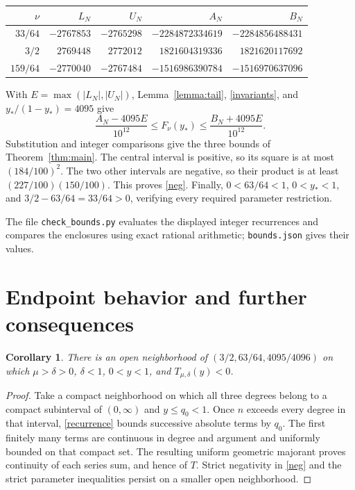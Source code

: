 \documentclass[11pt]{article}
\newtheorem{corollary}[theorem]{Corollary}
\newcommand{\F}{F}
\begin{document}
\begin{center}
\small
\begin{tabular}{@{}rrrrr@{}}
\toprule
$\nu$ & $L_N$ & $U_N$ & $A_N$ & $B_N$\\
\midrule
$33/64$ & $-2767853$ & $-2765298$ & $-2284872334619$ & $-2284856488431$\\
$3/2$ & $2769448$ & $2772012$ & $1821604319336$ & $1821620117692$\\
$159/64$ & $-2770040$ & $-2767484$ & $-1516986390784$ & $-1516970637096$\\
\bottomrule
\end{tabular}
\end{center}
With $E=\max(|L_N|,|U_N|)$, Lemma~\ref{lemma:tail},
\eqref{invariants}, and $y_* /(1-y_*)=4095$ give
\begin{equation}\label{enclosure}
 \frac{A_N-4095E}{10^{12}}\leq\F_\nu(y_*)\leq
 \frac{B_N+4095E}{10^{12}}.
\end{equation}
Substitution and integer comparisons give the three bounds of
Theorem~\ref{thm:main}. The central interval is positive, so its square is
at most $(184/100)^2$. The two other intervals are negative, so their
product is at least $(227/100)(150/100)$. This proves \eqref{neg}.
Finally, $0<63/64<1$, $0<y_*<1$, and
$3/2-63/64=33/64>0$, verifying every required parameter restriction.

The file \texttt{check\_bounds.py} evaluates the displayed integer
recurrences and compares the enclosures using exact rational arithmetic;
\texttt{bounds.json} gives their values.

\section{Endpoint behavior and further consequences}
\begin{corollary}\label{cor:open}
There is an open neighborhood of $(3/2,63/64,4095/4096)$ on which
$\mu>\delta>0$, $\delta<1$, $0<y<1$, and $T_{\mu,\delta}(y)<0$.
\end{corollary}
\begin{proof}
Take a compact neighborhood on which all three degrees belong to a
compact subinterval of $(0,\infty)$ and $y\leq q_0<1$.
Once $n$ exceeds every degree in that interval,
\eqref{recurrence} bounds successive absolute terms by $q_0$.
The first finitely many terms are continuous in degree and argument
and uniformly bounded on that compact set. The resulting uniform
geometric majorant proves continuity of each series sum, and hence
of $T$. Strict negativity in \eqref{neg} and the strict parameter
inequalities persist on a smaller open neighborhood.
\end{proof}
\end{document}

